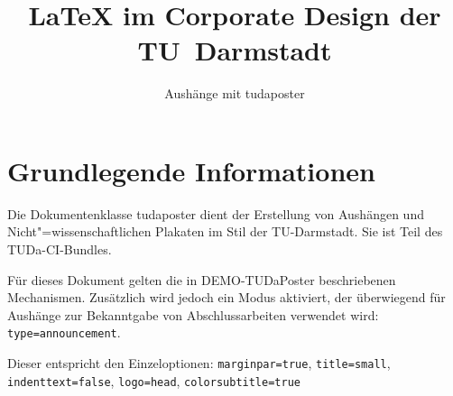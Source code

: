 \documentclass[
	paper=a4,
	ngerman,
	color=black!20,
	footer=true,
	type=announcement,
	]{tudaposter}
\let\code\texttt
\begin{document}
\title{\LaTeX{} im Corporate Design der TU~Darmstadt
}
\subtitle{Aushänge mit tudaposter}



\maketitle

\section*{Grundlegende Informationen}

Die Dokumentenklasse tudaposter dient der Erstellung von Aushängen und Nicht"=wissenschaftlichen Plakaten im Stil der TU-Darmstadt. Sie ist Teil des TUDa-CI-Bundles.

Für dieses Dokument gelten die in DEMO-TUDaPoster beschriebenen Mechanismen. Zusätzlich wird jedoch ein Modus aktiviert, der überwiegend für Aushänge zur Bekanntgabe von Abschlussarbeiten verwendet wird: \code{type=announcement}.

Dieser entspricht den Einzeloptionen: \code{marginpar=true}, \code{title=small}, \code{indenttext=false}, \code{logo=head}, \code{colorsubtitle=true}
\end{document}
